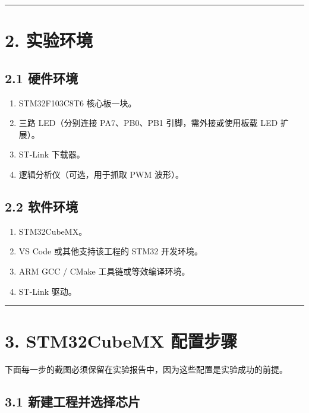 \documentclass[
  chinese,
  UTF8,
  oneside,
  openany]{ctexbook}
\providecommand{\tightlist}{%
  \setlength{\itemsep}{0pt}\setlength{\parskip}{0pt}}
\begin{document}
\begin{center}\rule{0.5\linewidth}{0.5pt}\end{center}

\section{2. 实验环境}\label{ux5b9eux9a8cux73afux5883-4}

\subsection{2.1 硬件环境}\label{ux786cux4ef6ux73afux5883-4}

\begin{enumerate}
\def\labelenumi{\arabic{enumi}.}
\tightlist
\item
  STM32F103C8T6 核心板一块。
\item
  三路 LED（分别连接 PA7、PB0、PB1 引脚，需外接或使用板载 LED 扩展）。
\item
  ST-Link 下载器。
\item
  逻辑分析仪（可选，用于抓取 PWM 波形）。
\end{enumerate}

\subsection{2.2 软件环境}\label{ux8f6fux4ef6ux73afux5883-4}

\begin{enumerate}
\def\labelenumi{\arabic{enumi}.}
\tightlist
\item
  STM32CubeMX。
\item
  VS Code 或其他支持该工程的 STM32 开发环境。
\item
  ARM GCC / CMake 工具链或等效编译环境。
\item
  ST-Link 驱动。
\end{enumerate}

\begin{center}\rule{0.5\linewidth}{0.5pt}\end{center}

\section{3. STM32CubeMX
配置步骤}\label{stm32cubemx-ux914dux7f6eux6b65ux9aa4-9}

下面每一步的截图必须保留在实验报告中，因为这些配置是实验成功的前提。

\subsection{3.1
新建工程并选择芯片}\label{ux65b0ux5efaux5de5ux7a0bux5e76ux9009ux62e9ux82afux7247-3}
\end{document}
